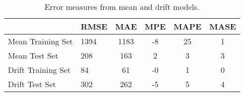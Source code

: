 \begin{table}[ht]
\centering
\caption[Error measures from mean and drift models]{Error measures from mean and drift models.} 
\label{tab:chp_ts:sma}
\begin{tabular}{llcccc}
  \toprule  & RMSE & MAE & MPE & MAPE & MASE \\ 
  \midrule Mean Training Set & 1394 & 1183 & -8 & 25 & 1 \\ 
  Mean Test Set & 208 & 163 & 2 & 3 & 3 \\ 
  Drift Training Set & 84 & 61 & -0 & 1 & 0 \\ 
  Drift Test Set & 302 & 262 & -5 & 5 & 4 \\ 
   \bottomrule \end{tabular}
\end{table}

